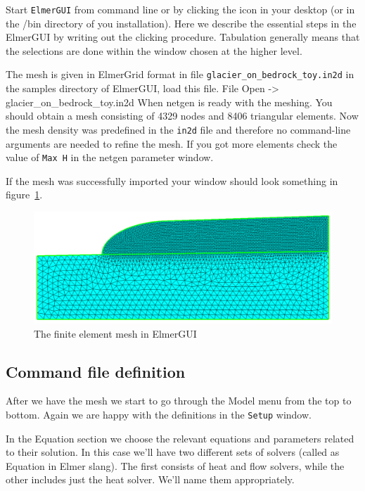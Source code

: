 Start \texttt{ElmerGUI} from command line or by clicking the icon in your desktop (or in the /bin directory of you installation). 
Here we describe the essential steps in the ElmerGUI by writing out the clicking procedure. Tabulation generally means that the 
selections are done within the window chosen at the higher level. 

The mesh is given in ElmerGrid format in file \texttt{glacier\_on\_bedrock\_toy.in2d} in the samples directory of ElmerGUI, 
load this file.
\ttbegin
File 
  Open -> glacier\_on\_bedrock\_toy.in2d
\ttend
When netgen is ready with the meshing. You should obtain a mesh consisting of 4329 nodes and 8406
triangular elements. Now the mesh density was predefined in the \texttt{in2d} file and therefore no command-line
arguments are needed to refine the mesh. If you got more elements check the value of \texttt{Max H} in the
netgen parameter window.

If the mesh was successfully imported your window should look something in figure~\ref{glacrock:mesh}.

\begin{figure}
\begin{center}
\includegraphics[width=120mm]{glacier_and_bedrock_toy_mesh}
\caption{The finite element mesh in ElmerGUI}\label{glacrock:mesh}
\end{center}
\end{figure}

\subsection*{Command file definition}

After we have the mesh we start to go through the Model menu from the top to bottom. 
Again we are happy with the definitions in the \texttt{Setup} window.

In the Equation section we choose the relevant equations and parameters related to their solution. 
In this case we'll have two different sets of solvers (called as Equation in Elmer slang). 
The first consists of heat and flow solvers, while the 
other includes just the heat solver. We'll name them appropriately. 

